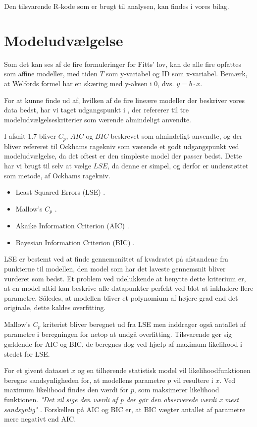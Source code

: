 Den tilsvarende R-kode som er brugt til analysen, kan findes i vores bilag.
\section*{Modeludvælgelse}
Som det kan ses af de fire formuleringer for Fitts' lov, kan de alle fire opfattes som affine modeller, med tiden $T$ som y-variabel og ID som x-variabel. Bemærk, at Welfords formel har en skæring med y-aksen i 0, dvs. $y=b\cdot x$.

For at kunne finde ud af, hvilken af de fire lineære modeller der beskriver vores data bedst, har vi taget udgangspunkt i \cite{wu2011experiments}, der refererer til tre modeludvælgelseskriterier som værende almindeligt anvendte.

I \cite{wu2011experiments} afsnit 1.7 bliver $C_p$, $AIC$ og $BIC$ beskrevet som almindeligt anvendte, og der bliver refereret til Ockhams ragekniv som værende et godt udgangspunkt ved modeludvælgelse, da det oftest er den simpleste model der passer bedst. Dette har vi brugt til selv at vælge $LSE$, da denne er simpel, og derfor er understøttet som metode, af Ockhams ragekniv.
\begin{itemize}
\item{Least Squared Errors (LSE) \cite{legendre1805}.}
\item{Mallow's $C_p$ \cite{mallow1973}.}
\item{Akaike Information Criterion (AIC) \cite{akaike1973}.}
\item{Bayesian Information Criterion (BIC) \cite{schwarz1978}.}
\end{itemize}
LSE er bestemt ved at finde gennemsnittet af kvadratet på afstandene fra punkterne til modellen, den model som har det laveste gennemsnit bliver vurderet som bedst. Et problem ved udelukkende at benytte dette kriterium er, at en model altid kan beskrive alle datapunkter perfekt ved blot at inkludere flere parametre. Således, at modellen bliver et polynomium af højere grad end det originale, dette kaldes overfitting.

Mallow's $C_p$ kriteriet bliver beregnet ud fra LSE men inddrager også antallet af parametre i beregningen for netop at undgå overfitting. Tilsvarende gør sig gældende for AIC og BIC, de beregnes dog ved hjælp af maximum likelihood i stedet for LSE.

For et givent datasæt $x$ og en tilhørende statistisk model vil likelihoodfunktionen beregne sandsynligheden for, at modellens parametre $p$ vil resultere i $x$. Ved maximum likelihood findes den værdi for  $p$, som maksimerer likelihood funktionen. \textit{"Det vil sige den v{\ae}rdi af  p der gør den observerede v{\ae}rdi x mest sandsynlig"} \cite{ditlevsen2011}. Forskellen på AIC og BIC er, at BIC vægter antallet af parametre mere negativt end AIC.

